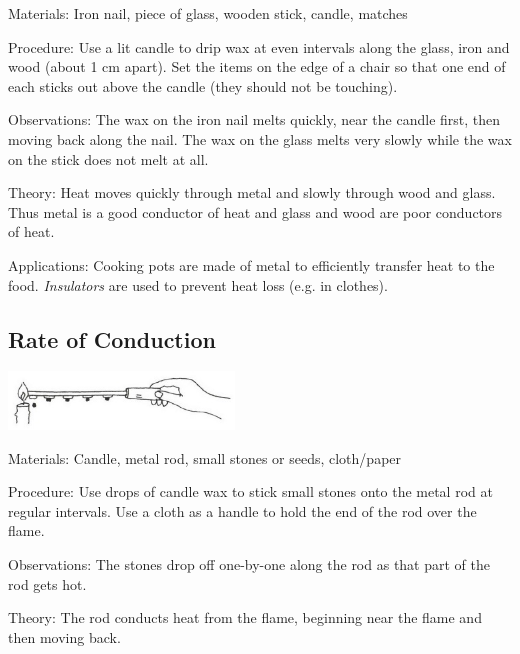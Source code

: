 \begin{multicols}{2}
\begin{description*}
\item[Materials:]{Iron nail, piece of glass, wooden stick, candle, matches}
\item[Procedure:]{Use a lit candle to drip wax at even intervals along the glass, iron and wood (about 1 cm apart). Set the items on the edge of a chair so that one end of each sticks out above the candle (they should not be touching).}
\item[Observations:]{The wax on the iron nail melts quickly, near the candle first, then moving back along the nail. The wax on the glass melts very slowly while the wax on the stick does not melt at all.}
\item[Theory:]{Heat moves quickly through metal and slowly through wood and glass. Thus metal is a good conductor of heat and glass and wood are poor conductors of heat.}
\item[Applications:]{Cooking pots are made of metal to efficiently transfer heat to the food. \emph{Insulators} are used to prevent heat loss (e.g. in clothes).}
\end{description*}

\subsection{Rate of Conduction}

\begin{center}
\includegraphics[width=0.45\textwidth]{./img/vso/conduction-rate.jpg}
\end{center}

\begin{description*}
\item[Materials:]{Candle, metal rod, small stones or seeds, cloth/paper}
\item[Procedure:]{Use drops of candle wax to stick small stones onto the metal rod at regular intervals. Use a cloth as a handle to hold the end of the rod over the flame.}
\item[Observations:]{The stones drop off one-by-one along the rod as that part of the rod gets hot.}
\item[Theory:]{The rod conducts heat from the flame, beginning near the flame and then moving back.}
\end{description*}


\end{multicols}
